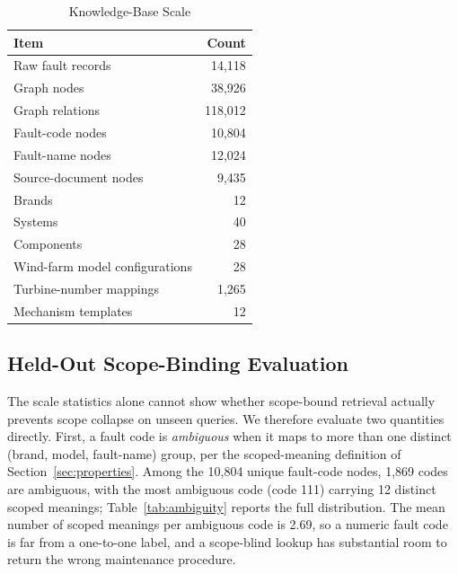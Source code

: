 \documentclass[lettersize,journal]{IEEEtran}
\begin{document}
\begin{table}[htbp]
\caption{Knowledge-Base Scale}
\label{tab:scale}
\centering
\begin{tabular}{lr}
\toprule
Item & Count \\
\midrule
Raw fault records & 14,118 \\
Graph nodes & 38,926 \\
Graph relations & 118,012 \\
Fault-code nodes & 10,804 \\
Fault-name nodes & 12,024 \\
Source-document nodes & 9,435 \\
Brands & 12 \\
Systems & 40 \\
Components & 28 \\
Wind-farm model configurations & 28 \\
Turbine-number mappings & 1,265 \\
Mechanism templates & 12 \\
\bottomrule
\end{tabular}
\end{table}

\subsection{Held-Out Scope-Binding Evaluation}
\label{sec:heldout}
The scale statistics alone cannot show whether scope-bound retrieval actually prevents scope collapse on unseen queries. We therefore evaluate two quantities directly. First, a fault code is \emph{ambiguous} when it maps to more than one distinct (brand, model, fault-name) group, per the scoped-meaning definition of Section~\ref{sec:properties}. Among the 10{,}804 unique fault-code nodes, 1{,}869 codes are ambiguous, with the most ambiguous code (code 111) carrying 12 distinct scoped meanings; Table~\ref{tab:ambiguity} reports the full distribution. The mean number of scoped meanings per ambiguous code is 2.69, so a numeric fault code is far from a one-to-one label, and a scope-blind lookup has substantial room to return the wrong maintenance procedure.
\end{document}

